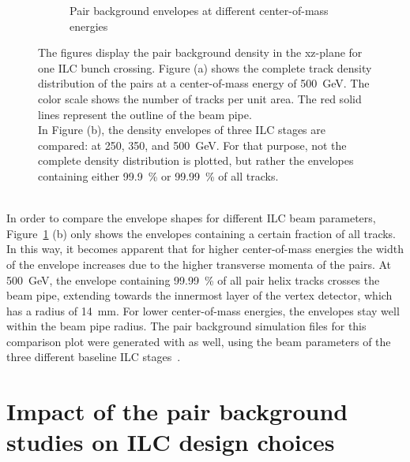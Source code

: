 \begin{figure}
\begin{subfigure}[b]{0.49\textwidth}
   \caption{Pair background envelopes at different center-of-mass energies}
   \end{subfigure}
   \caption[Pair background density]{The figures display the pair background density in the xz-plane for one ILC bunch crossing.
   Figure (a) shows the complete track density distribution of the pairs at a center-of-mass energy of \SI[detect-all]{500}{\GeV}.
   The color scale shows the number of tracks per unit area.
   The red solid lines represent the outline of the beam pipe.
   \\In Figure (b), the density envelopes of three ILC stages are compared: at 250, 350, and \SI[detect-all]{500}{\GeV}.
   For that purpose, not the complete density distribution is plotted, but rather the envelopes containing either \SI[detect-all]{99.9}{\percent} or \SI[detect-all]{99.99}{\percent} of all tracks.
   }
   \label{fig:PairBkg:Density}
 \end{figure}
\\In order to compare the envelope shapes for different ILC beam parameters, Figure~\ref{fig:PairBkg:Density} (b) only shows the envelopes containing a certain fraction of all tracks.
In this way, it becomes apparent that for higher center-of-mass energies the width of the envelope increases due to the higher transverse momenta of the pairs.
At \SI{500}{\GeV}, the envelope containing \SI{99.99}{\percent} of all pair helix tracks crosses the beam pipe, extending towards the innermost layer of the \sid vertex detector, which has a radius of \SI{14}{\milli\meter}.
For lower center-of-mass energies, the envelopes stay well within the beam pipe radius.
The pair background simulation files for this comparison plot were generated with \guineapig as well, using the beam parameters of the three different baseline ILC stages~\cite[p. 11]{TDR1}.

\section{Impact of the pair background studies on ILC design choices}
